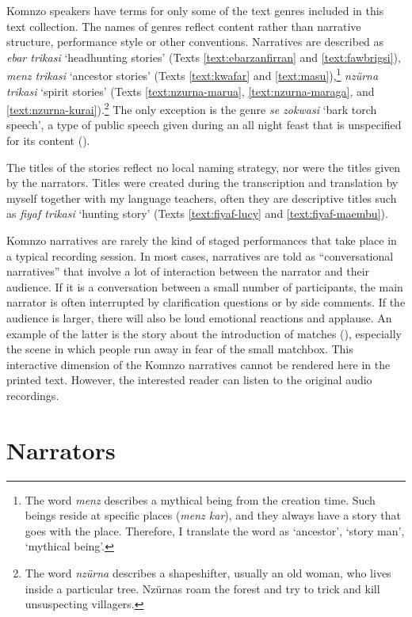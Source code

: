 Komnzo speakers have terms for only some of the text genres included in this text collection. The names of genres reflect content rather than narrative structure, performance style or other conventions. Narratives are described as \textit{ebar trikasi} `headhunting stories' (Texts \ref{text:ebarzanfirran} and \ref{text:fawbrigsi}), \textit{menz trikasi} `ancestor stories' (Texts \ref{text:kwafar} and \ref{text:masu}),\footnote{The word \textit{menz} describes a mythical being from the creation time. Such beings reside at specific places (\textit{menz kar}), and they always have a story that goes with the place. Therefore, I translate the word as `ancestor', `story man', `mythical being'.} \textit{nzürna trikasi} `spirit stories' (Texts \ref{text:nzurna-marua}, \ref{text:nzurna-maraga}, and \ref{text:nzurna-kurai}).\footnote{The word \textit{nzürna} describes a shapeshifter, usually an old woman, who lives inside a particular tree. Nzürnas roam the forest and try to trick and kill unsuspecting villagers.} The only exception is the genre \textit{se zokwasi} `bark torch speech', a type of public speech given during an all night feast that is unspecified for its content (\cite{Dohler:2019do}).

The titles of the stories reflect no local naming strategy, nor were the titles given by the narrators. Titles were created during the transcription and translation by myself together with my language teachers, often they are descriptive titles such as \textit{fiyaf trikasi} `hunting story' (Texts \ref{text:fiyaf-lucy} and \ref{text:fiyaf-maembu}).

Komnzo narratives are rarely the kind of staged performances that take place in a typical recording session. In most cases, narratives are told as ``conversational narratives'' that involve a lot of interaction between the narrator and their audience. If it is a conversation between a small number of participants, the main narrator is often interrupted by clarification questions or by side comments. If the audience is larger, there will also be loud emotional reactions and applause. An example of the latter is the story about the introduction of matches (), especially the scene in which people run away in fear of the small matchbox. This interactive dimension of the Komnzo narratives cannot be rendered here in the printed text. However, the interested reader can listen to the original audio recordings.

\section{Narrators}\label{sec:speakers}

